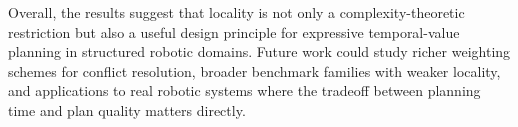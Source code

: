 \documentclass[]{jair}
\begin{document}
Overall, the results suggest that locality is not only a complexity-theoretic restriction but also a useful design principle for expressive temporal-value planning in structured robotic domains. Future work could study richer weighting schemes for conflict resolution, broader benchmark families with weaker locality, and applications to real robotic systems where the tradeoff between planning time and plan quality matters directly.



\printbibliography










\end{document}
